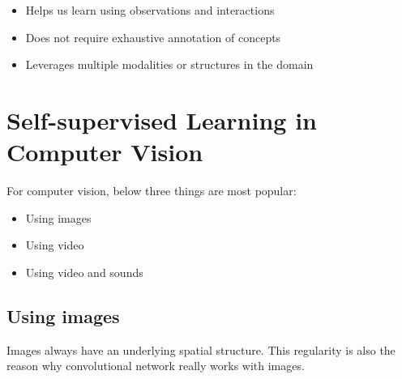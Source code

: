 \begin{itemize}
    \item Helps us learn using observations and interactions
    \item Does not require exhaustive annotation of concepts
    \item Leverages multiple modalities or structures in the domain
\end{itemize}

\section{Self-supervised Learning in Computer Vision}

For computer vision, below three things are most popular:
\begin{itemize}
    \item Using images
    \item Using video
    \item Using video and sounds
\end{itemize}{}

\subsection{Using images}
Images always have an underlying spatial structure. This regularity is also the reason why convolutional network really works with images. 

